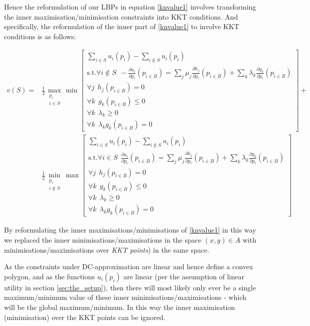 Hence the reformulation of our LBPs in equation \ref{knvalue1} involves transforming the inner maximisation/minimisation constraints into KKT conditions.
And specifically, the reformulation of the inner part of \eqref{knvalue1} to involve KKT conditions is as follows:

\begin{equation}
\label{kkt_optimization1}
\begin{aligned}
v(S) =& 
\frac{1}{2}\max_{\substack{p_i \\ i\in S}}\min\left[\substack{
	\sum_{i\in S}u_i(p_i) - \sum_{i\notin S}u_i(p_i)\\
	\text{s.t.}\forall i\notin S~~-\frac{\partial u_i}{\partial p_i}(p_{i\in B})=\sum_j\mu_j\frac{\partial h_j}{\partial p_i}(p_{i\in B}) + \sum_k\lambda_k\frac{\partial g_k}{\partial p_i}(p_{i\in B})\\
	\forall j~~ h_j(p_{i\in B})=0\\
	\forall k~~ g_k(p_{i\in B})\le 0\\
	\forall k~~ \lambda_k \ge 0\\
	\forall k~~ \lambda_kg_k(p_{i\in B})= 0}
\right] +\\
&\frac{1}{2}\min_{\substack{p_i \\ i\notin S}}\max\left[\substack{
	\sum_{i\in S}u_i(p_i) - \sum_{i\notin S}u_i(p_i)\\
	\text{s.t.}\forall i\in S~~\frac{\partial u_i}{\partial p_i}(p_{i\in B})=\sum_j\mu_j\frac{\partial h_j}{\partial p_i}(p_{i\in B}) + \sum_k\lambda_k\frac{\partial g_k}{\partial p_i}(p_{i\in B})\\
	\forall j~~ h_j(p_{i\in B})=0\\
	\forall k~~ g_k(p_{i\in B})\le 0\\
	\forall k~~ \lambda_k \ge 0\\
	\forall k~~ \lambda_kg_k(p_{i\in B})= 0}
\right]
\end{aligned}
\end{equation}

By reformulating the inner maximisations/minimisations of \eqref{knvalue1} in this way we replaced the inner minimisations/maximisations in the space $(x,y)\in A$ with minimisations/maximisations over \emph{KKT points}) in the same space.%

As the constraints under DC-approximation are linear and hence define a convex polygon,
and as the functions $u_i(p_i)$ are linear (per the assumption of linear utility in section \ref{sec:the_setup}), then there will most likely only ever be a single maximum/minimum value of these inner minimisations/maximisations - which will be the global maximum/minimum.
In this way the inner maximisation (minimisation) over the KKT points can be ignored.


